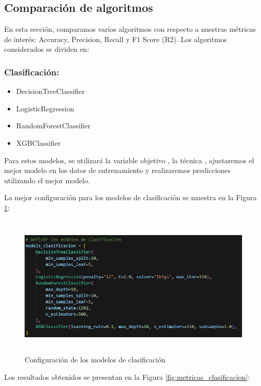 \subsection{Comparación de algoritmos}

En esta sección, comparamos varios algoritmos con respecto a nuestras métricas de interés: Accuracy, Precision, Recall y F1 Score (R2). Los algoritmos considerados se dividen en:

\subsubsection*{Clasificación:}

\begin{itemize}
    \item DecisionTreeClassifier
    \item LogisticRegression
    \item RandomForestClassifier
    \item XGBClassifier
\end{itemize}

Para estos modelos, se utilizará la variable objetivo , la técnica , ajustaremos el mejor modelo en los datos de entrenamiento y realizaremos predicciones utilizando el mejor modelo.

La mejor configuración para los modelos de clasificación se muestra en la Figura \ref{fig:config_clasifiacion}:

\begin{figure}[H]
    \centering
    \includegraphics[width=6.06111in,height=2.68611in]{img/compara_algoritmos/configModelsClasificacion.png}
    \caption{Configuración de los modelos de clasificación}
    \label{fig:config_clasifiacion}
\end{figure}

Los resultados obtenidos se presentan en la Figura \ref{fig:metricas_clasificacion}:

